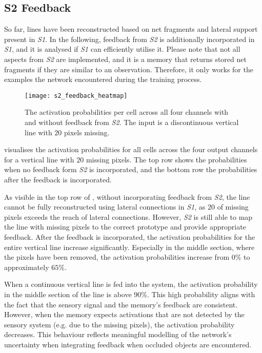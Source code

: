 \subsection{S2 Feedback}
So far, lines have been reconstructed based on net fragments and lateral support present in \emph{S1}.
In the following, feedback from \emph{S2} is additionally incorporated in \emph{S1}, and it is analysed if \emph{S1} can efficiently utilise it.
Please note that not all aspects from \emph{S2} are implemented, and it is a memory that returns stored net fragments if they are similar to an observation.
Therefore, it only works for the examples the network encountered during the training process.

\begin{figure}[h]
    \centering
    \texttt{[image: s2\_feedback\_heatmap]}
    \caption[Activation probabilities with/without \emph{S2} feedback]{The activation probabilities per cell across all four channels with and without feedback from \emph{S2}. The input is a discontinuous vertical line with $20$ pixels missing.}
\end{figure}
%
 visualises the activation probabilities for all cells across the four output channels for a vertical line with $20$ missing pixels.
The top row shows the probabilities when no feedback form \emph{S2} is incorporated, and the bottom row the probabilities after the feedback is incorporated.

As visible in the top row of , without incorporating feedback from \emph{S2}, the line cannot be fully reconstructed using lateral connections in \emph{S1}, as $20$ of missing pixels exceeds the reach of lateral connections. However, \emph{S2} is still able to map the line with missing pixels to the correct prototype and provide appropriate feedback. After the feedback is incorporated, the activation probabilities for the entire vertical line increase significantly. Especially in the middle section, where the pixels have been removed, the activation probabilities increase from $0\%$ to approximately $65\%$.

When a continuous vertical line is fed into the system, the activation probability in the middle section of the line is above $90\%$.
This high probability aligns with the fact that the sensory signal and the memory's feedback are consistent.
However, when the memory expects activations that are not detected by the sensory system (e.g. due to the missing pixels), the activation probability decreases. This behaviour reflects meaningful modelling of the network's uncertainty when integrating feedback when occluded objects are encountered.

